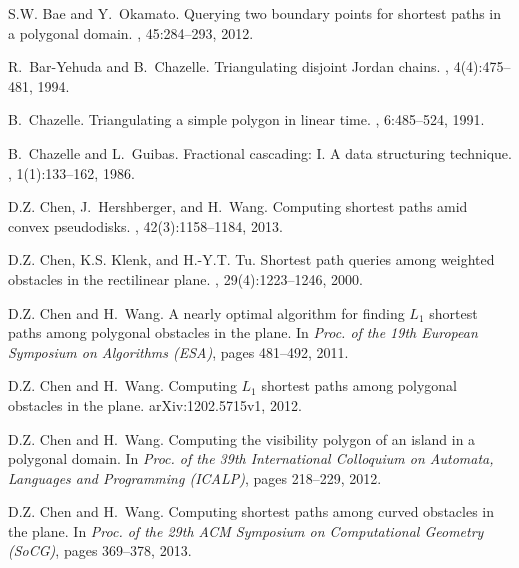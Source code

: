 \documentclass[english,runningheads,11pt]{llncs}
\begin{document}


\begin{thebibliography}{10}

S.W. Bae and Y.~Okamato.
\newblock Querying two boundary points for shortest paths in a polygonal
  domain.
, 45:284--293,
  2012.

R.~Bar-Yehuda and B.~Chazelle.
\newblock Triangulating disjoint {Jordan} chains.
, 4(4):475--481, 1994.

B.~Chazelle.
\newblock Triangulating a simple polygon in linear time.
, 6:485--524, 1991.

B.~Chazelle and L.~Guibas.
\newblock Fractional cascading: {I. A} data structuring technique.
, 1(1):133--162, 1986.

D.Z. Chen, J.~Hershberger, and H.~Wang.
\newblock Computing shortest paths amid convex pseudodisks.
, 42(3):1158--1184, 2013.

D.Z. Chen, K.S. Klenk, and H.-Y.T. Tu.
\newblock Shortest path queries among weighted obstacles in the rectilinear
  plane.
, 29(4):1223--1246, 2000.

D.Z. Chen and H.~Wang.
\newblock A nearly optimal algorithm for finding {$L_1$} shortest paths among
  polygonal obstacles in the plane.
\newblock In {\em Proc. of the 19th European Symposium on Algorithms (ESA)},
  pages 481--492, 2011.

D.Z. Chen and H.~Wang.
\newblock Computing {$L_1$} shortest paths among polygonal obstacles in the
  plane.
\newblock arXiv:1202.5715v1, 2012.

D.Z. Chen and H.~Wang.
\newblock Computing the visibility polygon of an island in a polygonal domain.
\newblock In {\em Proc. of the 39th International Colloquium on Automata,
  Languages and Programming (ICALP)}, pages 218--229, 2012.

D.Z. Chen and H.~Wang.
\newblock Computing shortest paths among curved obstacles in the plane.
\newblock In {\em Proc. of the 29th ACM Symposium on Computational Geometry
  (SoCG)}, pages 369--378, 2013.


\end{thebibliography}
\end{document}
